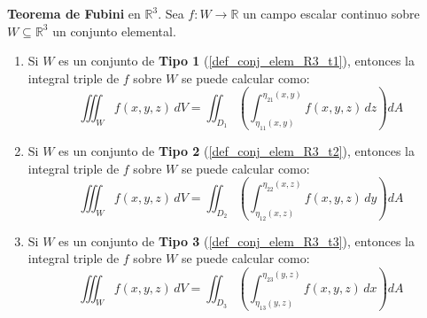 \begin{theorem} \label{teo:fubini_r3} \textbf{Teorema de Fubini} en $\mathbb{R}^3.$
    Sea $f:W\to\mathbb{R}$ un campo escalar continuo sobre $W\subseteq\mathbb{R}^3$ un conjunto elemental.
    
    \begin{enumerate} 
        \item Si $W$ es un conjunto de \textbf{Tipo 1}  (\ref{def_conj_elem_R3_t1}), entonces la integral triple de $f$ sobre $W$ se puede calcular como:
        \[
            \iiint_W f(x,y,z) \, dV = \iint_{D_1} \left( \int_{\eta_{11}(x,y)}^{\eta_{21}(x,y)} f(x,y,z) \, dz \right) dA
        \]
       
        \item Si $W$ es un conjunto de \textbf{Tipo 2} (\ref{def_conj_elem_R3_t2}), entonces la integral triple de $f$ sobre $W$ se puede calcular como:
        \[
            \iiint_W f(x,y,z) \, dV = \iint_{D_2} \left( \int_{\eta_{12}(x,z)}^{\eta_{22}(x,z)} f(x,y,z) \, dy \right) dA
        \]
       
 \item Si $W$ es un conjunto de \textbf{Tipo 3} (\ref{def_conj_elem_R3_t3}), entonces la integral triple de $f$ sobre $W$ se puede calcular como:
        \[
            \iiint_W f(x,y,z) \, dV = \iint_{D_3} \left( \int_{\eta_{13}(y,z)}^{\eta_{23}(y,z)} f(x,y,z) \, dx \right) dA
        \]
    \end{enumerate}
\end{theorem}


